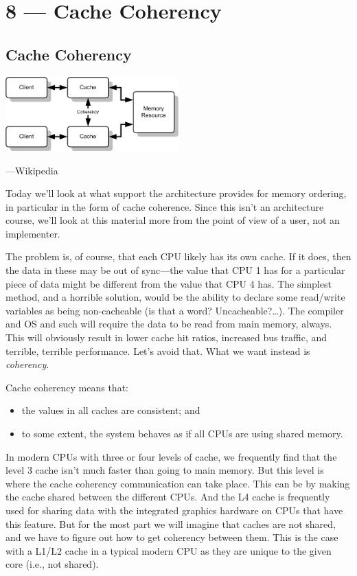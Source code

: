 \documentclass[a4paper]{report}
\begin{document}
\chapter*{8 --- Cache Coherency}


\section*{Cache Coherency}

\begin{center}
    \includegraphics[width=0.5\textwidth]{images/coherency}

\hfill ---Wikipedia
\end{center}

Today we'll look at what support the architecture provides for memory ordering, in
particular in the form of cache coherence. Since this isn't an
architecture course, we'll look at this material more from the point
of view of a user, not an implementer.

The problem is, of course, that each CPU likely has its own cache. If it does, then the data in these may be out of sync---the value that CPU 1 has for a particular piece of data might be different from the value that CPU 4 has. The simplest method, and a horrible solution, would be the ability to declare some read/write variables as being non-cacheable (is that a word? Uncacheable?\ldots). The compiler and OS and such will require the data to be read from main memory, always. This will obviously result in lower cache hit ratios, increased bus traffic, and terrible, terrible performance. Let's avoid that. What we want instead is \textit{coherency}.

Cache coherency means that:
  \begin{itemize}
    \item the values in all caches are consistent; and
    \item to some extent, the system behaves as if all CPUs are using shared memory.
  \end{itemize}
  
In modern CPUs with three or four levels of cache, we frequently find that the level 3 cache isn't much faster than going to main memory. But this level is where the cache coherency communication can take place. This can be by making the cache shared between the different CPUs. And the L4 cache is frequently used for sharing data with the integrated graphics hardware on CPUs that have this feature. But for the most part we will imagine that caches are not shared, and we have to figure out how to get coherency between them. This is the case with a L1/L2 cache in a typical modern CPU as they are unique to the given core (i.e., not shared).
  
\end{document}
